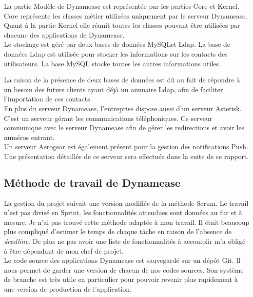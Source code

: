 La partie Modèle de Dynamease est représentée par les parties Core et Kernel. Core représente les classes métier utilisées uniquement par le serveur Dynamease. Quant à la partie Kernel elle réunit toutes les classes pouvant être utilisées par chacune des applications de Dynamease.\\

Le stockage est géré par deux bases de données MySQLet Ldap. La base de données Ldap est utilisée pour stocker les informations sur les contacts des utilisateurs. La base MySQL stocke toutes les autres informations utiles.

La raison de la présence de deux bases de données est dû au fait de répondre à un besoin des futurs clients ayant déjà un annuaire Ldap, afin de faciliter l'importation de ces contacts.\\

En plus du serveur Dynamease, l'entreprise dispose aussi d'un serveur Asterisk. C'est un serveur gérant les communications téléphoniques. Ce serveur communique avec le serveur Dynamease afin de gérer les redirections et avoir les numéros entrant.\\

Un serveur Aerogear est également présent pour la gestion des notifications Push. Une présentation détaillée de ce serveur sera effectuée dans la suite de ce rapport.

\subsection{Méthode de travail de Dynamease}

La gestion du projet suivait une version modifiée de la méthode Scrum. Le travail n'est pas divisé en Sprint, les fonctionnalités attendues sont données au fur et à mesure. Je n'ai pas trouvé cette méthode adaptée à mon travail. Il était beaucoup plus compliqué d'estimer le temps de chaque tâche en raison de l'absence de \textit{deadline}. De plus ne pas avoir une liste de fonctionnalités à accomplir m'a obligé à être dépendant de mon chef de projet.\\

Le code source des applications Dynamease est sauvegardé sur un dépôt Git. Il nous permet de garder une version de chacun de nos codes sources. Son système de branche est très utile en particulier pour pouvoir revenir plus rapidement à une version de production de l'application.